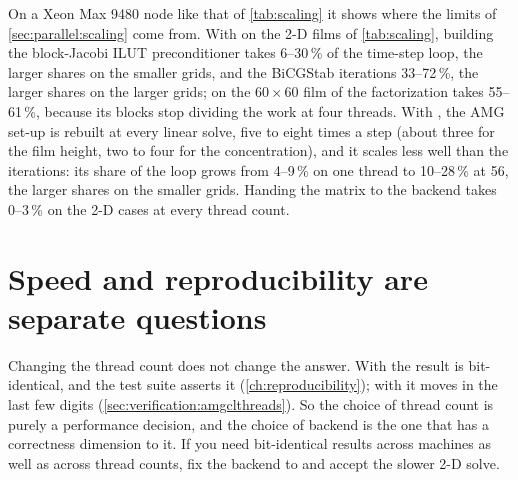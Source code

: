 On a Xeon Max 9480 node like that of \cref{tab:scaling} it shows where the limits of
\cref{sec:parallel:scaling} come from. With  on the 2-D films of
\cref{tab:scaling}, building the block-Jacobi ILUT preconditioner takes 6--30\,\%
of the time-step loop, the larger shares on the smaller grids, and the BiCGStab
iterations 33--72\,\%, the larger shares on the larger grids; on the $60\times60$
film of  the factorization takes 55--61\,\%, because its
blocks stop dividing the work at four threads. With , the AMG set-up
is rebuilt at every linear solve, five to eight times a step (about three
for the film height, two to four for the concentration), and it scales less well than the
iterations: its share of the loop grows from 4--9\,\% on one
thread to 10--28\,\% at 56, the larger
shares on the smaller grids. Handing the matrix to the backend takes
0--3\,\% on the 2-D cases at every thread count.

\section{Speed and reproducibility are separate questions}
\label{sec:parallel:repro}

Changing the thread count does not change the answer. With  the
result is bit-identical, and the test suite asserts it
(\cref{ch:reproducibility}); with  it moves in the last few digits
(\cref{sec:verification:amgclthreads}). So the choice of thread count is purely
a performance decision, and the choice of backend is the one that has a
correctness dimension to it. If you need bit-identical results across machines
as well as across thread counts, fix the backend to  and accept
the slower 2-D solve.
